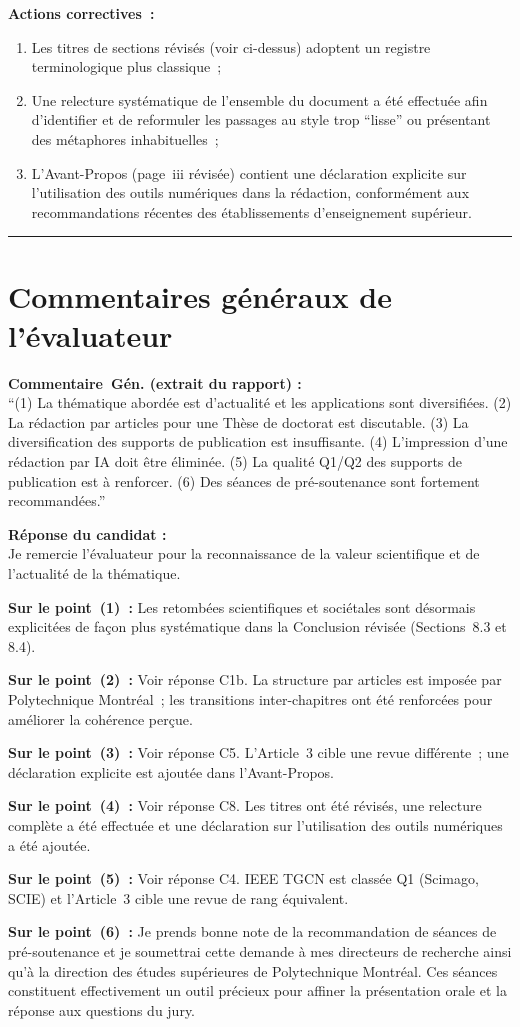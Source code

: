 \documentclass[12pt,a4paper]{article}
\newcommand{\Commentaire}[2]{%
  \begin{reviewerbox}
    \textbf{Commentaire~#1 (extrait du rapport) :}\\#2
  \end{reviewerbox}%
}
\newcommand{\Reponse}[1]{%
  \begin{responsebox}
    \textbf{Réponse du candidat :}\\#1
  \end{responsebox}%
}
\begin{document}
{\textbf{Actions correctives~:}
\begin{enumerate}[leftmargin=*]
  \item Les titres de sections révisés (voir ci-dessus) adoptent un registre terminologique plus classique~;
  \item Une relecture systématique de l'ensemble du document a été effectuée afin d'identifier et de reformuler les passages au style trop ``lisse'' ou présentant des métaphores inhabituelles~;
  \item L'Avant-Propos (page~iii révisée) contient une déclaration explicite sur l'utilisation des outils numériques dans la rédaction, conformément aux recommandations récentes des établissements d'enseignement supérieur.
\end{enumerate}
}

\bigskip
\hrule
\bigskip

\section*{Commentaires généraux de l'évaluateur}

\Commentaire{Gén.}{
  ``(1) La thématique abordée est d'actualité et les applications sont diversifiées.
  (2) La rédaction par articles pour une Thèse de doctorat est discutable.
  (3) La diversification des supports de publication est insuffisante.
  (4) L'impression d'une rédaction par IA doit être éliminée.
  (5) La qualité Q1/Q2 des supports de publication est à renforcer.
  (6) Des séances de pré-soutenance sont fortement recommandées.''
}

\Reponse{
Je remercie l'évaluateur pour la reconnaissance de la valeur scientifique et de l'actualité de la thématique.

\textbf{Sur le point~(1)~:} Les retombées scientifiques et sociétales sont désormais explicitées de façon plus systématique dans la Conclusion révisée (Sections~8.3 et 8.4).

\textbf{Sur le point~(2)~:} Voir réponse C1b. La structure par articles est imposée par Polytechnique Montréal~; les transitions inter-chapitres ont été renforcées pour améliorer la cohérence perçue.

\textbf{Sur le point~(3)~:} Voir réponse C5. L'Article~3 cible une revue différente~; une déclaration explicite est ajoutée dans l'Avant-Propos.

\textbf{Sur le point~(4)~:} Voir réponse C8. Les titres ont été révisés, une relecture complète a été effectuée et une déclaration sur l'utilisation des outils numériques a été ajoutée.

\textbf{Sur le point~(5)~:} Voir réponse C4. IEEE TGCN est classée Q1 (Scimago, SCIE) et l'Article~3 cible une revue de rang équivalent.

\textbf{Sur le point~(6)~:} Je prends bonne note de la recommandation de séances de pré-soutenance et je soumettrai cette demande à mes directeurs de recherche ainsi qu'à la direction des études supérieures de Polytechnique Montréal. Ces séances constituent effectivement un outil précieux pour affiner la présentation orale et la réponse aux questions du jury.
}
\end{document}
